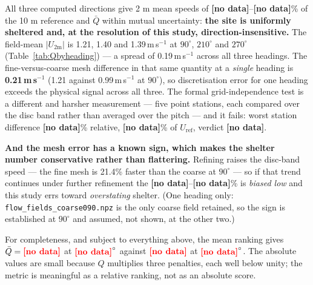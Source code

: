 \documentclass[11pt,letterpaper]{article}
\newcommand{\MISSINGNUM}{\textbf{\color{red}[no data]}}%
\newcommand{\GridDiff}{\MISSINGNUM}\newcommand{\GridDiffUref}{\MISSINGNUM}%
\newcommand{\GridVerdict}{\MISSINGNUM}\newcommand{\ConvFine}{\MISSINGNUM}%
\newcommand{\UfieldFracMin}{\MISSINGNUM}\newcommand{\UfieldFracMax}{\MISSINGNUM}%
\newcommand{\QbestHeading}{\MISSINGNUM}\newcommand{\QworstHeading}{\MISSINGNUM}%
\newcommand{\QbestMean}{\MISSINGNUM}\newcommand{\QworstMean}{\MISSINGNUM}%
\newcommand{\QbestWorstRatio}{\MISSINGNUM}\newcommand{\BlockedMean}{\MISSINGNUM}%
\begin{document}
All three computed directions give 2 m mean speeds of \UfieldFracMin--\UfieldFracMax\%
of the 10 m reference and $\bar Q$ within mutual uncertainty: \textbf{the site is
uniformly sheltered and, at the resolution of this study, direction-insensitive.}
The field-mean $|U_{2\text{m}}|$ is 1.21, 1.40 and 1.39\,m\,s$^{-1}$ at $90^\circ$,
$210^\circ$ and $270^\circ$ (Table~\ref{tab:Qbyheading}) --- a spread of
0.19\,m\,s$^{-1}$ across all three headings. The fine-versus-coarse mesh difference in
that same quantity at a \emph{single} heading is
\textbf{0.21\,m\,s$^{-1}$} (1.21 against 0.99\,m\,s$^{-1}$ at $90^\circ$), so
discretisation error for one heading exceeds the physical signal across all three. The
formal grid-independence test is a different and harsher measurement --- five point
stations, each compared over the disc band rather than averaged over the pitch --- and it
fails: worst station difference \GridDiff\% relative, \GridDiffUref\% of
$U_{\text{ref}}$, verdict \GridVerdict.

\textbf{And the mesh error has a known sign, which makes the shelter number
conservative rather than flattering.} Refining raises the disc-band speed --- the fine
mesh is 21.4\% faster than the coarse at $90^\circ$ --- so if that trend continues under
further refinement the \UfieldFracMin--\UfieldFracMax\% is \emph{biased low} and this
study errs toward \emph{overstating} shelter. (One heading only:
\texttt{flow\_fields\_coarse090.npz} is the only coarse field retained, so the sign is
established at $90^\circ$ and assumed, not shown, at the other two.)

For completeness, and subject to everything above, the mean ranking gives
$\bar Q = \QbestMean$ at $\QbestHeading^\circ$ against $\QworstMean$ at
$\QworstHeading^\circ$. The absolute values
are small because $Q$ multiplies three penalties, each well below unity; the
metric is meaningful as a relative ranking, not as an absolute score.
\end{document}
